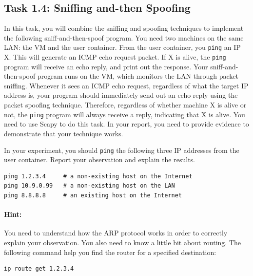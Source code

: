 \subsection{Task 1.4: Sniffing and-then Spoofing}  

In this task, you will combine the sniffing and spoofing techniques
to implement the following sniff-and-then-spoof program.
You need two machines on the same LAN: the VM and the user container. 
From the user container, you
{\tt ping} an IP X. This will generate an ICMP echo
request packet. If X is alive, the {\tt ping} program will receive
an echo reply, and print out the response. Your sniff-and-then-spoof
program runs on the VM, which monitors the LAN through packet sniffing. Whenever it
sees an ICMP echo request, regardless of what the target IP address is,
your program should immediately send out an echo reply using the
packet spoofing technique. Therefore, regardless of whether machine X
is alive or not, the {\tt ping} program will always receive
a reply, indicating that X is alive. You need to use Scapy
to do this task. In your report, you need to provide evidence to demonstrate 
that your technique works. 

In your experiment, you should \texttt{ping} the following three IP addresses
from the user container. 
Report your observation and explain the results. 

\begin{lstlisting}
ping 1.2.3.4     # a non-existing host on the Internet
ping 10.9.0.99   # a non-existing host on the LAN
ping 8.8.8.8     # an existing host on the Internet
\end{lstlisting}

\paragraph{Hint:} You need to understand how the ARP protocol works in order to 
correctly explain your observation. You also need to know a little bit 
about routing. The following command help you find the router
for a specified destination:

\begin{lstlisting}
ip route get 1.2.3.4 
\end{lstlisting}
 
 



